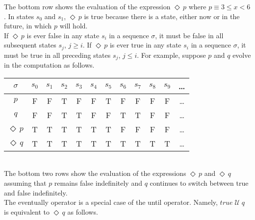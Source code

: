 \documentclass[fleqn, leqno]{article}
\newcommand{\Until}{\;\mathcal{U}\;}
\newcommand{\Event}{\Diamond\,}
\begin{document}
The bottom row shows the evaluation of the expression $\Event p$ where $p\equiv 3\le x<6$.
In states $s_0$ and $s_1$, $\Event p$ is true because there is a state, either now or in the future, in which $p$ will hold.\\

If $\Event p$ is ever false in any state $s_i$ in a sequence $\sigma$, it must be false in all subsequent states $s_j$, $j\ge i$.
If $\Event p$ is ever true in any state $s_i$ in a sequence $\sigma$, it must be true in all preceding states $s_j$, $j\le i$.
For example, suppose $p$ and $q$ evolve in the computation as follows.\\

\begin{tabular}{c|ccccccccccc}
  $\sigma$       & $s_0$ & $s_1$ & $s_2$ & $s_3$ & $s_4$ & $s_5$ & $s_6$ & $s_7$ & $s_8$& $s_9$  & \dots \\
  \hline
  $p$            & F     & F     & T     & F     & F     & T     & F     & F     & F     & F     &  \dots\\
  $q$            & F     & F     & T     & T     & F     & F     & T     & T     & F     & F     &  \dots\\
  $\Event p$     & T     & T     & T     & T     & T     & T     & F     & F     & F     & F     &  \dots\\
  $\Event q$     & T     & T     & T     & T     & T     & T     & T     & T     & T     & T     &  \dots\\
\end{tabular}\\

The bottom two rows show the evaluation of the expressions $\Event p$ and $\Event q$
assuming that $p$ remains false indefinitely and $q$ continues to switch between true and false indefinitely.\\

The eventually operator is a special case of the until operator.
Namely, $true \Until q$ is equivalent to $\Event q$ as follows.
\end{document}
